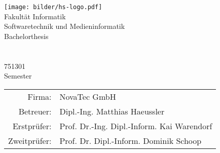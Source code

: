 \begin{titlepage}
	\begin{center}
		\texttt{[image: bilder/hs-logo.pdf]}\\
		\vspace{1cm} \Large Fakultät Informatik\\
		\vspace{0.5cm} \Large Softwaretechnik und Medieninformatik\\
		\vspace{1.25cm} \Large Bachelorthesis\\
		\vspace{0.5cm} \Huge \thetitle \\
		\vspace{1.5cm} \Large \theauthor \\
		\vspace{0.2cm} \small 751301\\
		\vspace{0.5cm} \normalsize Semester \the\year\\
		\vfill
		
		\begin{tabular}{rl}
			Firma: & NovaTec GmbH\\ [0.1cm]
			Betreuer: & Dipl.-Ing. Matthias Haeussler\\ [0.5cm]
			Erstprüfer: & Prof. Dr.-Ing. Dipl.-Inform. Kai Warendorf \\ [0.1cm]
			Zweitprüfer: & Prof. Dr. Dipl.-Inform. Dominik Schoop\\[0.5cm]
		\end{tabular}
	\end{center}
\end{titlepage}